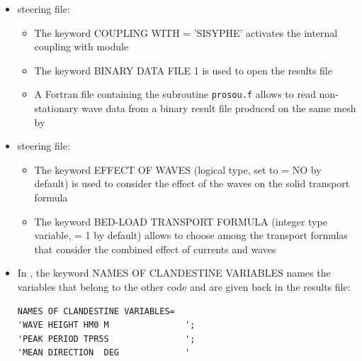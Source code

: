 \begin{itemize}
\item {} steering file:
\begin{itemize}
\item The keyword {\ttfamily COUPLING WITH = 'SISYPHE'} activates the internal coupling with module \sisyphe{}
\item The keyword {\ttfamily BINARY DATA FILE 1} is used to open the \tomawac{} results file
\item A Fortran file containing the subroutine \texttt{prosou.f} allows to read non-stationary wave data from a binary result file produced on the same mesh by \tomawac{}
\end{itemize}
\item \sisyphe{} steering file:
\begin{itemize}
\item The keyword {\ttfamily EFFECT OF WAVES} (logical type, set to {\ttfamily = NO} by default) is used to consider the effect of the waves on the solid transport formula
\item The keyword {\ttfamily BED-LOAD TRANSPORT FORMULA} (integer type variable, {\ttfamily = 1} by default) allows to choose among the transport formulas that consider the combined effect of currents and waves
\end{itemize}
\end{itemize}

\begin{itemize}
\item In , the keyword {\ttfamily NAMES OF CLANDESTINE VARIABLES} names the variables that belong to the other code and are given back in the results file:
\begin{lstlisting}[frame=trBL]    
NAMES OF CLANDESTINE VARIABLES= 
'WAVE HEIGHT HM0 M               ';
'PEAK PERIOD TPR5S               ';
'MEAN DIRECTION  DEG             '
\end{lstlisting}
\end{itemize}
